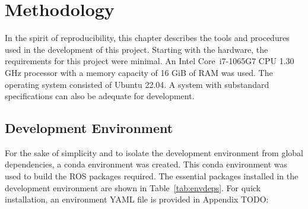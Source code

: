 \chapter{Methodology}\label{cha:methodology}

    In the spirit of reproducibility, this chapter describes the tools and procedures used in the development of this project. Starting with the hardware, the requirements for this project were minimal. An Intel\textsuperscript{\textregistered} Core\texttrademark\ i7-1065G7 CPU 1.30 GHz processor with a memory capacity of 16 GiB of RAM was used. The operating system consisted of Ubuntu 22.04. A system with substandard specifications can also be adequate for development.

\section{Development Environment}

    For the sake of simplicity and to isolate the development environment from global dependencies, a \textsf{conda} environment was created. This \textsf{conda} environment was used to build the \ac{ROS} packages required. The essential packages installed in the development environment are shown in Table~\ref{tab:envdeps}. For quick installation, an environment \ac{YAML} file is provided in Appendix TODO:

